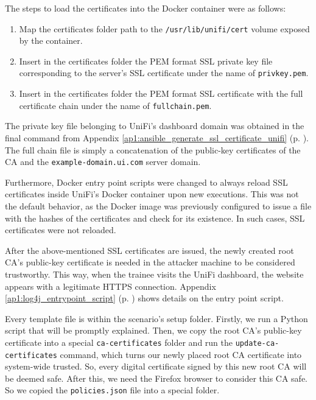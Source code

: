 
The steps to load the certificates into the Docker container were as follows:

\begin{enumerate}
    \item Map the certificates folder path to the \texttt{/usr/lib/unifi/cert} volume exposed by the container.
    \item Insert in the certificates folder the PEM format SSL private key file corresponding to the server's SSL certificate under the name of \texttt{privkey.pem}.
    \item Insert in the certificates folder the PEM format SSL certificate with the full certificate chain under the name of \texttt{fullchain.pem}.
\end{enumerate}

The private key file belonging to UniFi's dashboard domain was obtained in the final command from Appendix \ref{ap1:ansible_generate_ssl_certificate_unifi} (p. \pageref{ap1:ansible_generate_ssl_certificate_unifi}). The full chain file is simply a concatenation of the public-key certificates of the CA and the \texttt{example-domain.ui.com} server domain. 

Furthermore, Docker entry point scripts were changed to always reload SSL certificates inside UniFi's Docker container upon new executions. This was not the default behavior, as the Docker image was previously configured to issue a file with the hashes of the certificates and check for its existence. In such cases, SSL certificates were not reloaded.


After the above-mentioned SSL certificates are issued, the newly created root CA's public-key certificate is needed in the attacker machine to be considered trustworthy. This way, when the trainee visits the UniFi dashboard, the website appears with a legitimate HTTPS connection. Appendix \ref{ap1:log4j_entrypoint_script} (p. \pageref{ap1:log4j_entrypoint_script}) shows details on the entry point script.

Every template file is within the scenario's setup folder. Firstly, we run a Python script that will be promptly explained. Then, we copy the root CA's public-key certificate into a special \texttt{ca-certificates} folder and run the \texttt{update-ca-certificates} command, which turns our newly placed root CA certificate into system-wide trusted. So, every digital certificate signed by this new root CA will be deemed safe. After this, we need the Firefox browser to consider this CA safe. So we copied the \texttt{policies.json} file into a special folder.

